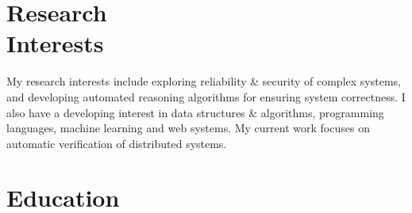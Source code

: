 \documentclass[margin,line,letter]{resume}
\begin{document}
\begin{resume}

\section{\mysidestyle Research\\Interests}
    My research interests include exploring reliability \& security of complex systems, and developing automated reasoning algorithms for ensuring system correctness. I also have a developing interest in data structures \& algorithms, programming languages, machine learning and web systems. My current work focuses on automatic verification of distributed systems.


\section{\mysidestyle Education}


\end{resume}
\end{document}
